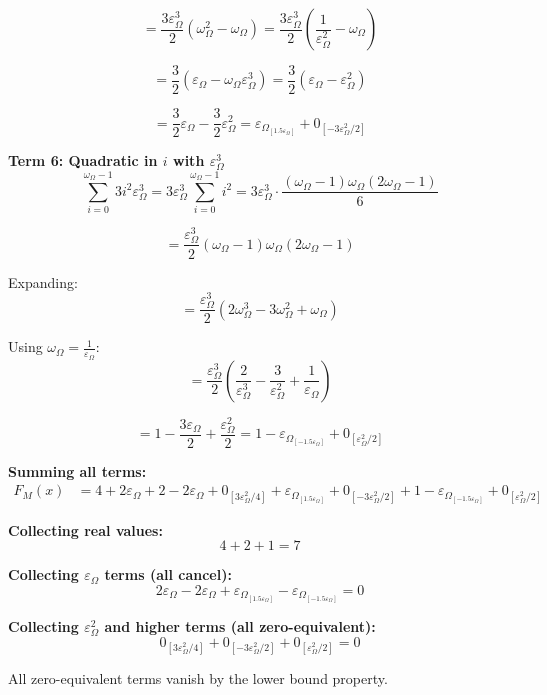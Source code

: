 \documentclass{article}
\begin{document}
$$= \frac{3\varepsilon_\Omega^3}{2}(\omega_\Omega^2 - \omega_\Omega) = \frac{3\varepsilon_\Omega^3}{2}\left(\frac{1}{\varepsilon_\Omega^2} - \omega_\Omega\right)$$

$$= \frac{3}{2}(\varepsilon_\Omega - \omega_\Omega\varepsilon_\Omega^3) = \frac{3}{2}(\varepsilon_\Omega - \varepsilon_\Omega^2)$$

$$= \frac{3}{2}\varepsilon_\Omega - \frac{3}{2}\varepsilon_\Omega^2 = \varepsilon_\Omega_{[1.5\varepsilon_\Omega]}+ 0_{[-3\varepsilon_\Omega^2/2]}$$

\textbf{Term 6: Quadratic in $i$ with $\varepsilon_\Omega^3$}
$$\sum_{i=0}^{\omega_\Omega - 1} 3i^2\varepsilon_\Omega^3 = 3\varepsilon_\Omega^3 \sum_{i=0}^{\omega_\Omega - 1} i^2 = 3\varepsilon_\Omega^3 \cdot \frac{(\omega_\Omega - 1)\omega_\Omega(2\omega_\Omega - 1)}{6}$$

$$= \frac{\varepsilon_\Omega^3}{2}(\omega_\Omega - 1)\omega_\Omega(2\omega_\Omega - 1)$$

Expanding:
$$= \frac{\varepsilon_\Omega^3}{2}(2\omega_\Omega^3 - 3\omega_\Omega^2 + \omega_\Omega)$$

Using $\omega_\Omega = \frac{1}{\varepsilon_\Omega}$:
$$= \frac{\varepsilon_\Omega^3}{2}\left(\frac{2}{\varepsilon_\Omega^3} - \frac{3}{\varepsilon_\Omega^2} + \frac{1}{\varepsilon_\Omega}\right)$$

$$= 1 - \frac{3\varepsilon_\Omega}{2} + \frac{\varepsilon_\Omega^2}{2} = 1 -\varepsilon_\Omega_{[-1.5\varepsilon_\Omega]} + 0_{[\varepsilon_\Omega^2/2]}$$

\textbf{Summing all terms:}
\begin{align*}
F_M(x) &= 4 + 2\varepsilon_\Omega+ 2 -2\varepsilon_\Omega + 0_{[3\varepsilon_\Omega^2/4]} +\varepsilon_\Omega_{[1.5\varepsilon_\Omega]} + 0_{[-3\varepsilon_\Omega^2/2]} + 1 - \varepsilon_\Omega_{[-1.5\varepsilon_\Omega]} + 0_{[\varepsilon_\Omega^2/2]}
\end{align*}

\textbf{Collecting real values:}
$$4 + 2 + 1 = 7$$

\textbf{Collecting $\varepsilon_\Omega$ terms (all cancel):}
$$2\varepsilon_\Omega -2\varepsilon_\Omega+ \varepsilon_\Omega_{[1.5\varepsilon_\Omega]} -\varepsilon_\Omega_{[-1.5\varepsilon_\Omega]} = 0$$

\textbf{Collecting $\varepsilon_\Omega^2$ and higher terms (all zero-equivalent):}
$$0_{[3\varepsilon_\Omega^2/4]} + 0_{[-3\varepsilon_\Omega^2/2]} + 0_{[\varepsilon_\Omega^2/2]} = 0$$

All zero-equivalent terms vanish by the lower bound property.
\end{document}
